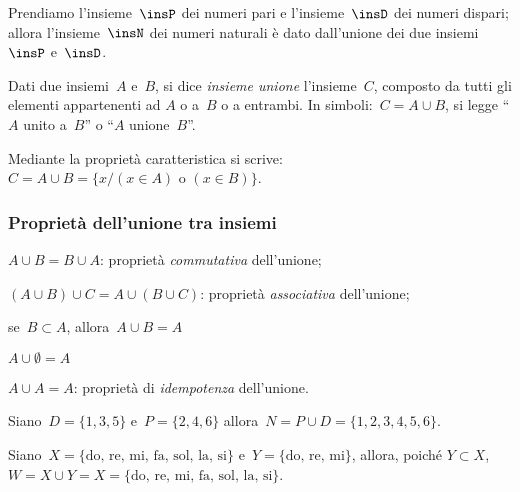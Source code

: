 Prendiamo l'insieme~$\insP$ dei numeri pari e l'insieme~$\insD$ dei numeri 
dispari; allora l'insieme~$\insN$ dei numeri naturali è dato dall'unione dei 
due insiemi~$\insP$ e~$\insD$.

\begin{definizione}
Dati due insiemi~$A$ e~$B$, si dice
\emph{insieme unione} l'insieme~$C$, composto da tutti gli elementi 
appartenenti ad $A$ o a~$B$ o a entrambi.
In simboli:~$C=A\cup B$, si legge ``$A$ unito a~$B$''
o ``$A$ unione~$B$''.
\end{definizione}
\begin{center}
 
\end{center}


Mediante la proprietà caratteristica si 
scrive:~$C=A\cup B=\{x/(x\in A)\text{ o }(x\in B)\}$.

\subsubsection{Proprietà dell'unione tra insiemi}

\begin{enumeratea}
\item $A\cup B=B\cup A$: proprietà \emph{commutativa} dell'unione;
\item $(A\cup B)\cup C=A\cup (B\cup C)$: proprietà \emph{associativa} 
dell'unione;
\item se~$B\subset A$, allora~$A\cup B=A$
\item $A\cup \emptyset =A$
\item $A\cup A=A$: proprietà di \emph{idempotenza} dell'unione.
\end{enumeratea}

\begin{exrig}
 \begin{esempio}
Siano~$D=\{1,3,5\}$ e~$P=\{2,4,6\}$ allora~$N=P\cup D=\{1,2,3,4,5,6\}$.
\begin{center}
 
\end{center}

\end{esempio}

\begin{esempio}
Siano~$X=\{\text{do, re, mi, fa, sol, la, si}\}$
e~$Y=\{\text{do, re, mi}\}$, allora, 
poiché $Y\subset X$, $W=X\cup Y=X=\{\text{do, re, mi, fa, sol, la, si}\}$.
\begin{center}
 
\end{center}

\end{esempio}
\end{exrig}

